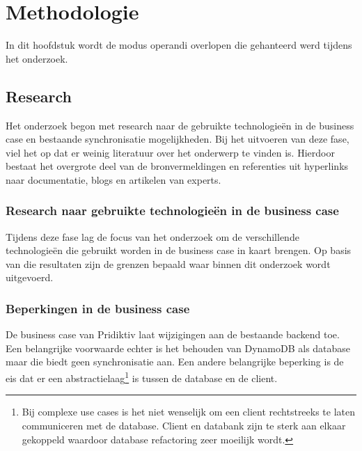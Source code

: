 
\chapter{Methodologie}
\label{ch:methodologie}
In dit hoofdstuk wordt de modus operandi overlopen die gehanteerd werd tijdens het onderzoek.
\section{Research}
Het onderzoek begon met research naar de gebruikte technologie\"en in de business case en bestaande synchronisatie mogelijkheden. Bij het uitvoeren van deze fase, viel het op dat er weinig literatuur over het onderwerp te vinden is. Hierdoor bestaat het overgrote deel van de bronvermeldingen en referenties uit hyperlinks naar documentatie, blogs en artikelen van experts. 
\subsection{Research naar gebruikte technologie\"en in de business case}
Tijdens deze fase lag de focus van het onderzoek om de verschillende technologie\"en die gebruikt worden in de business case in kaart brengen. Op basis van die resultaten zijn de grenzen bepaald waar binnen dit onderzoek wordt uitgevoerd.
\clearpage
\subsection{Beperkingen in de business case}
\label{subsec:beperkingen-business-case}
De business case van Pridiktiv laat wijzigingen aan de bestaande backend toe. Een belangrijke voorwaarde echter is het behouden van DynamoDB als database maar die biedt geen synchronisatie aan. Een andere belangrijke beperking is de eis dat er een abstractielaag\footnote{Bij complexe use cases is het niet wenselijk om een client rechtstreeks te laten communiceren met de database. Client en databank zijn te sterk aan elkaar gekoppeld waardoor database refactoring zeer moeilijk wordt.} is tussen de database en de client.

